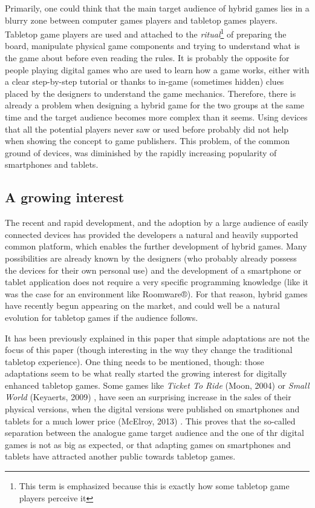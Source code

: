 Primarily, one could think that the main target audience of hybrid games lies in a blurry zone between computer games players and tabletop games players. Tabletop game players are used and attached to the \textit{ritual}\footnote{This term is emphasized because this is exactly how some tabletop game players perceive it} of preparing the board, manipulate physical game components and trying to understand what is the game about before even reading the rules.
It is probably the opposite for people playing digital games who are used to learn how a game works, either with a clear step-by-step tutorial or thanks to in-game (sometimes hidden) clues placed by the designers to understand the game mechanics. 
Therefore, there is already a problem when designing a hybrid game for the two groups at the same time and the target audience becomes more complex than it seems. Using devices that all the potential players never saw or used before probably did not help when showing the concept to game publishers. 
This problem, of the common ground of devices, was diminished by the rapidly increasing popularity of smartphones and tablets.

\subsection{A growing interest}
The recent and rapid development, and the adoption by a large audience of easily connected devices has provided the developers a natural and heavily supported common platform, which enables the further development of hybrid games. Many possibilities are already known by the designers (who probably already possess the devices for their own personal use) and the development of a smartphone or tablet application does not require a very specific programming knowledge (like it was the case for an environment like Roomware®). For that reason, hybrid games have recently begun appearing on the market, and could well be a natural evolution for tabletop games if the audience follows.

It has been previously explained in this paper that simple adaptations are not the focus of this paper (though interesting in the way they change the traditional tabletop experience). 
One thing needs to be mentioned, though: those adaptations seem to be what really started the growing interest for digitally enhanced tabletop games. Some games like \textit{Ticket To Ride} (Moon, 2004) \cite{game:ticket} or \textit{Small World} (Keyaerts, 2009) \cite{game:tw}, have seen an surprising increase in the sales of their physical versions, when the digital versions were published on smartphones and tablets for a much lower price (McElroy, 2013) \cite{web:poly}. This proves that the so-called separation between the analogue game target audience and the one of thr digital games is not as big as expected, or that adapting games on smartphones and tablets have attracted another public towards tabletop games.

